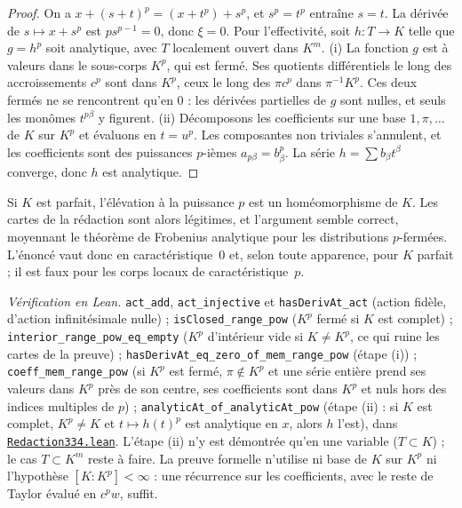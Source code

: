 \begin{proof}
On a $x + (s+t)^p = (x + t^p) + s^p$, et $s^p = t^p$ entraîne $s = t$. La dérivée de $s \mapsto x + s^p$ est $p s^{p-1} = 0$, donc $\xi = 0$. Pour l'effectivité, soit $h : T \to K$ telle que $g = h^p$ soit analytique, avec $T$ localement ouvert dans $K^m$. (i) La fonction $g$ est à valeurs dans le sous-corps $K^p$, qui est fermé. Ses quotients différentiels le long des accroissements $c^p$ sont dans $K^p$, ceux le long des $\pi c^p$ dans $\pi^{-1}K^p$. Ces deux fermés ne se rencontrent qu'en $0$ : les dérivées partielles de $g$ sont nulles, et seuls les monômes $t^{p\beta}$ y figurent. (ii) Décomposons les coefficients sur une base $1, \pi, \dots$ de $K$ sur $K^p$ et évaluons en $t = u^p$. Les composantes non triviales s'annulent, et les coefficients sont des puissances $p$-ièmes $a_{p\beta} = b_\beta^p$. La série $h = \sum b_\beta t^\beta$ converge, donc $h$ est analytique.
\end{proof}

Si $K$ est parfait, l'élévation à la puissance $p$ est un homéomorphisme de $K$. Les cartes de la rédaction sont alors légitimes, et l'argument semble correct, moyennant le théorème de Frobenius analytique pour les distributions $p$-fermées. L'énoncé vaut donc en caractéristique~$0$ et, selon toute apparence, pour $K$ parfait ; il est faux pour les corps locaux de caractéristique~$p$.

\begin{sloppypar}
\noindent\emph{Vérification en Lean.} \texttt{act\_add}, \texttt{act\_injective} et \texttt{hasDerivAt\_act} (action fidèle, d'action infinitésimale nulle) ; \texttt{isClosed\_range\_pow} ($K^p$ fermé si $K$ est complet) ; \texttt{interior\_range\_pow\_eq\_empty} ($K^p$ d'intérieur vide si $K \ne K^p$, ce qui ruine les cartes de la preuve) ; \texttt{hasDerivAt\_eq\_zero\_of\_mem\_range\_pow} (étape (i)) ; \texttt{coeff\_mem\_range\_pow} (si $K^p$ est fermé, $\pi \notin K^p$ et une série entière prend ses valeurs dans $K^p$ près de son centre, ses coefficients sont dans $K^p$ et nuls hors des indices multiples de $p$) ; \texttt{analyticAt\_of\_analyticAt\_pow} (étape (ii) : si $K$ est complet, $K^p \ne K$ et $t \mapsto h(t)^p$ est analytique en $x$, alors $h$ l'est), dans \href{\leanblobmain/Redaction334.lean}{\texttt{Redaction334.\allowbreak{}lean}}. L'étape (ii) n'y est démontrée qu'en une variable ($T \subset K$) ; le cas $T \subset K^m$ reste à faire. La preuve formelle n'utilise ni base de $K$ sur $K^p$ ni l'hypothèse $[K : K^p] < \infty$ : une récurrence sur les coefficients, avec le reste de Taylor évalué en $c^p w$, suffit.
\end{sloppypar}

